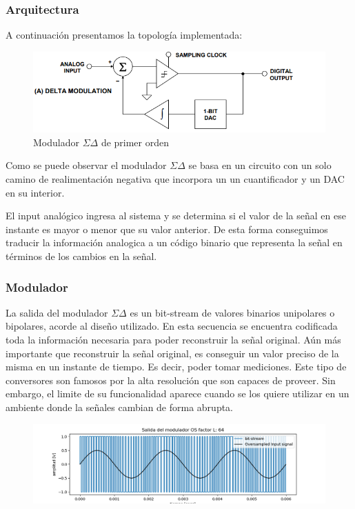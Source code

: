 \subsubsection{Arquitectura}

A continuación presentamos la topología implementada:

\begin{figure}[H]
	\centering
	\includegraphics[width=0.7\linewidth]{ImagenesEjercicio2/diagramaEnBloques}
	\caption{Modulador $\Sigma\Delta$ de primer orden}
	\label{fig:diagramaenbloques}
\end{figure}

Como se puede observar el modulador $\Sigma\Delta$ se basa en un circuito con un solo camino de realimentación negativa que incorpora un un cuantificador y un DAC en su interior.

El input analógico ingresa al sistema y se determina si el valor de la señal en ese instante es mayor o menor que su valor anterior. De esta forma conseguimos traducir la información analogica a un código binario que representa la señal en términos de los cambios en la señal.



\subsubsection{Modulador}
La salida del modulador $\Sigma\Delta$ es un bit-stream de valores binarios unipolares o bipolares, acorde al diseño utilizado. En esta secuencia se encuentra codificada toda la información necesaria para poder reconstruir la señal original. Aún más importante que reconstruir la señal original, es conseguir un valor preciso de la misma en un instante de tiempo. Es decir, poder tomar mediciones. Este tipo de conversores son famosos por la alta resolución que son capaces de proveer. Sin embargo, el limite de su funcionalidad aparece cuando se los quiere utilizar en un ambiente donde la señales cambian de forma abrupta.

\begin{figure}[H]
	\centering
	\includegraphics[width=0.7\linewidth]{ImagenesEjercicio2/BitsStream64}
	\caption{}
	\label{fig:bitsstream64}
\end{figure}


